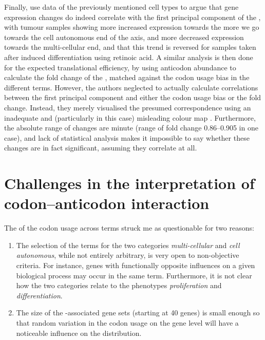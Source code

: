 
Finally, \citet{Gingold:2014} use \rnaseq data of the previously mentioned cell
types to argue that gene expression changes do indeed correlate with the first
principal component of the \pca, with tumour samples showing more increased
expression towards the more we go towards the cell autonomous end of the axis,
and more decreased expression towards the multi-cellular end, and that this
trend is reversed for samples taken after induced differentiation using retinoic
acid. A similar analysis is then done for the expected translational efficiency,
by using \trna anticodon abundance to calculate the fold change of the \tai,
matched against the codon usage bias in the different \go terms. However, the
authors neglected to actually calculate correlations between the first principal
component and either the codon usage bias or the \tai fold change. Instead, they
merely visualised the presumed correspondence using an inadequate and
(particularly in this case) misleading colour map \citep{Borland:2007}.
Furthermore, the absolute range of changes are minute (range of \tai fold change
\numrange{0.86}{0.905} in one case), and lack of statistical analysis makes it
impossible to say whether these changes are in fact significant, assuming they
correlate at all.

\section{Challenges in the interpretation of codon–anticodon interaction}

The \pca of the codon usage across \go terms struck me as questionable for two
reasons:

\begin{enumerate}
    \item The selection of the \go terms for the two categories
        \emph{multi-cellular} and \emph{cell autonomous}, while not entirely
        arbitrary, is very open to non-objective criteria. For instance, genes
        with functionally opposite influences on a given biological process may
        occur in the same \go term. Furthermore, it is not clear how the two
        categories relate to the phenotypes \emph{proliferation} and
        \emph{differentiation}.
    \item The size of the \go-associated gene sets (starting at \num{40} genes)
        is small enough so that random variation in the codon usage on the gene
        level will have a noticeable influence on the distribution.
\end{enumerate}

